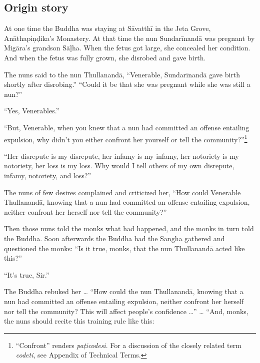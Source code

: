 \documentclass[12pt,openany]{book}%
\begin{document}
\subsection*{Origin story }

At one time the Buddha was staying at \textsanskrit{Sāvatthī} in the Jeta Grove, \textsanskrit{Anāthapiṇḍika}’s Monastery. At that time the nun \textsanskrit{Sundarīnandā} was pregnant by \textsanskrit{Migāra}’s grandson \textsanskrit{Sāḷha}. When the fetus got large, she concealed her condition. And when the fetus was fully grown, she disrobed and gave birth. 

The nuns said to the nun \textsanskrit{Thullanandā}, “Venerable, \textsanskrit{Sundarīnandā} gave birth shortly after disrobing.” “Could it be that she was pregnant while she was still a nun?” 

“Yes, Venerables.” 

“But, Venerable, when you knew that a nun had committed an offense entailing expulsion, why didn’t you either confront her yourself or tell the community?”\footnote{“Confront” renders \textit{\textsanskrit{paṭicodesi}}. For a discussion of the closely related term \textit{codeti}, see Appendix of Technical Terms. } 

“Her disrepute is my disrepute, her infamy is my infamy, her notoriety is my notoriety, her loss is my loss. Why would I tell others of my own disrepute, infamy, notoriety, and loss?” 

The nuns of few desires complained and criticized her, “How could Venerable \textsanskrit{Thullanandā}, knowing that a nun had committed an offense entailing expulsion, neither confront her herself nor tell the community?” 

Then those nuns told the monks what had happened, and the monks in turn told the Buddha. Soon afterwards the Buddha had the Sangha gathered and questioned the monks: “Is it true, monks, that the nun \textsanskrit{Thullanandā} acted like this?” 

“It’s true, Sir.” 

The Buddha rebuked her … “How could the nun \textsanskrit{Thullanandā}, knowing that a nun had committed an offense entailing expulsion, neither confront her herself nor tell the community? This will affect people’s confidence …” … “And, monks, the nuns should recite this training rule like this: 
\end{document}
